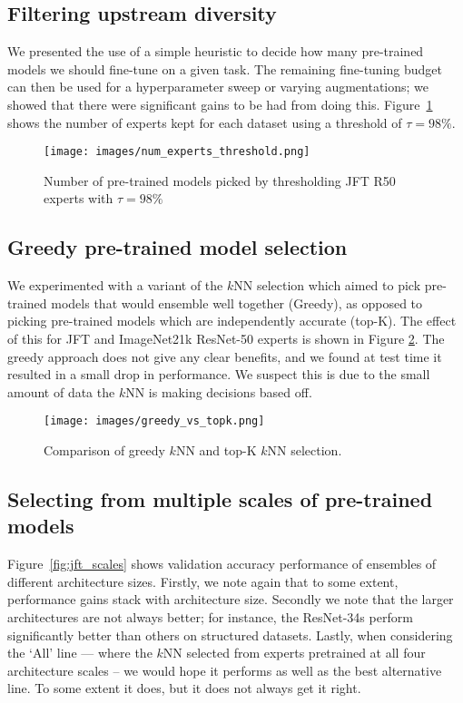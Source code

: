 \documentclass{article} \usepackage{iclr2021_conference,times}
\begin{document}
\subsection{Filtering upstream diversity}
\label{app:num_experts_threshold}
We presented the use of a simple heuristic to decide how many pre-trained models we should fine-tune on a given task. The remaining fine-tuning budget can then be used for a hyperparameter sweep or varying augmentations; we showed that there were significant gains to be had from doing this. Figure~\ref{fig:threshold} shows the number of experts kept for each dataset using a threshold of $\tau=98\%$.
\begin{figure}[!htb]
    \centering
    \texttt{[image: images/num\_experts\_threshold.png]}
    \caption{Number of pre-trained models picked by thresholding JFT R50 experts with $\tau=98\%$}
    \label{fig:threshold}
\end{figure}


\subsection{Greedy pre-trained model selection}
\label{app:greedy_NN}
We experimented with a variant of the $k$NN selection which aimed to pick pre-trained models that would ensemble well together (Greedy), as opposed to picking pre-trained models which are independently accurate (top-K). The effect of this for JFT and ImageNet21k ResNet-50 experts is shown in Figure \ref{fig:greedy_vs_topk}. The greedy approach does not give any clear benefits, and we found at test time it resulted in a small drop in performance. We suspect this is due to the small amount of data the $k$NN is making decisions based off.

\begin{figure}[!htb]
    \centering
    \texttt{[image: images/greedy\_vs\_topk.png]}
    \caption{Comparison of greedy $k$NN and top-K $k$NN selection.}
    \label{fig:greedy_vs_topk}
\end{figure}


\subsection{Selecting from multiple scales of pre-trained models}
\label{app:scale}
Figure~\ref{fig:jft_scales} shows validation accuracy performance of ensembles of different architecture sizes. Firstly, we note again that to some extent, performance gains stack with architecture size. Secondly we note that the larger architectures are not always better; for instance, the ResNet-34s perform significantly better than others on structured datasets. Lastly, when considering the `All' line --- where the $k$NN selected from experts pretrained at all four architecture scales -- we would hope it performs as well as the best alternative line. To some extent it does, but it does not always get it right. 
\end{document}
